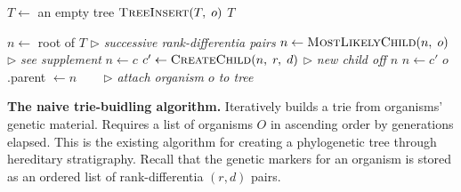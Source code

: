 \begin{algorithm}[h]
    \begin{algorithmic}[1]
    \small{
            \State $T \gets$ an empty tree
                \State $\textsc{TreeInsert}(T,\; o)$
            \EndFor
            \State \Return $T$
        \EndFunction

            \State $n \gets$ root of $T$
             \text{ } $\triangleright$ \textit{successive rank-differentia pairs}
                \State $n \gets \textsc{MostLikelyChild}(n,\; o)$ \text{ } $\triangleright$ \textit{see supplement}
                    \State $n \gets c$
                \Else
                    \State $c' \gets \textsc{CreateChild}(n,\; r,\; d)$ \text{ } $\triangleright$ \textit{new child off $n$}
                    \State $n \gets c'$
                \EndIf
            \EndFor
            \State $o$.parent $\gets n$ ~~~ $\triangleright$ \textit{attach organism $o$ to tree}
        \EndFunction
    }
    \end{algorithmic}
    \caption{\textbf{The naive trie-buidling algorithm.} \small Iteratively builds a trie from organisms' genetic material. Requires a list of organisms $O$ in ascending order by generations elapsed. This is the existing algorithm for creating a phylogenetic tree through hereditary stratigraphy. Recall that the genetic markers for an organism is stored as an ordered list of rank-differentia $(r, d)$ pairs. \vspace{-1.5em}}
    \label{alg:old}
\end{algorithm}
